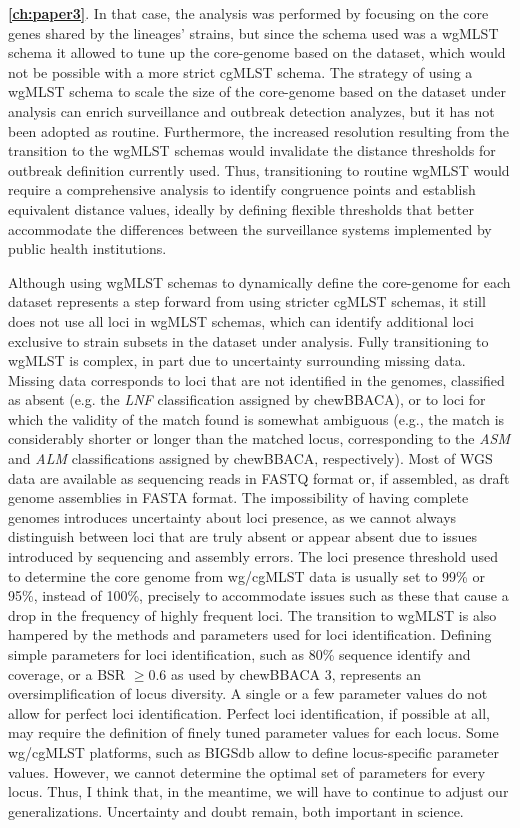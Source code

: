 \textbf{\autoref{ch:paper3}}. In that case, the analysis was performed by focusing on the core genes shared by the lineages' strains, but since the schema used was a \ac{wgMLST} schema it allowed to tune up the core-genome based on the dataset, which would not be possible with a more strict \ac{cgMLST} schema. The strategy of using a \ac{wgMLST} schema to scale the size of the core-genome based on the dataset under analysis can enrich surveillance and outbreak detection analyzes, but it has not been adopted as routine. Furthermore, the increased resolution resulting from the transition to the \ac{wgMLST} schemas would invalidate the distance thresholds for outbreak definition currently used. Thus, transitioning to routine \ac{wgMLST} would require a comprehensive analysis to identify congruence points and establish equivalent distance values, ideally by defining flexible thresholds that better accommodate the differences between the surveillance systems implemented by public health institutions\cite{mixao_multi-country_2025}.

Although using \ac{wgMLST} schemas to dynamically define the core-genome for each dataset represents a step forward from using stricter \ac{cgMLST} schemas, it still does not use all loci in \ac{wgMLST} schemas, which can identify additional loci exclusive to strain subsets in the dataset under analysis. Fully transitioning to \ac{wgMLST} is complex, in part due to uncertainty surrounding missing data. Missing data corresponds to loci that are not identified in the genomes, classified as absent (e.g. the \textit{LNF} classification assigned by chewBBACA), or to loci for which the validity of the match found is somewhat ambiguous (e.g., the match is considerably shorter or longer than the matched locus, corresponding to the \textit{ASM} and \textit{ALM} classifications assigned by chewBBACA, respectively). Most of \ac{WGS} data are available as sequencing reads in FASTQ format or, if assembled, as draft genome assemblies in FASTA format. The impossibility of having complete genomes introduces uncertainty about loci presence, as we cannot always distinguish between loci that are truly absent or appear absent due to issues introduced by sequencing and assembly errors. The loci presence threshold used to determine the core genome from \ac{wg/cgMLST} data is usually set to 99\% or 95\%, instead of 100\%, precisely to accommodate issues such as these that cause a drop in the frequency of highly frequent loci. The transition to \ac{wgMLST} is also hampered by the methods and parameters used for loci identification. Defining simple parameters for loci identification, such as 80\% sequence identify and coverage, or a \ac{BSR} $\geq0.6$ as used by chewBBACA 3, represents an oversimplification of locus diversity. A single or a few parameter values do not allow for perfect loci identification. Perfect loci identification, if possible at all, may require the definition of finely tuned parameter values for each locus. Some \ac{wg/cgMLST} platforms, such as \ac{BIGSdb} allow to define locus-specific parameter values. However, we cannot determine the optimal set of parameters for every locus. Thus, I think that, in the meantime, we will have to continue to adjust our generalizations. Uncertainty and doubt remain, both important in science.

